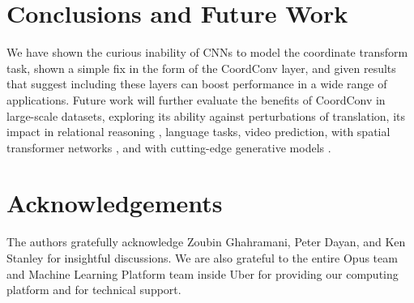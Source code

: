 \documentclass{article}
\begin{document}




\vspace*{-.5em}
\section{Conclusions and Future Work}
\vspace*{-.6em}

We have shown the curious inability of CNNs to model the coordinate transform task, shown a simple fix in the form
of the CoordConv layer, and given results that suggest including these layers can boost performance
in a wide range of applications. Future work will further evaluate the benefits of CoordConv in large-scale datasets, 
exploring its ability against perturbations of translation, 
its impact in relational reasoning \cite{sortofclevr}, language tasks, video prediction, with spatial transformer networks \cite{jaderberg:spatial}, and with cutting-edge generative models \cite{gregor-2015-draw:-a-recurrent-neural}. 


\clearpage

\section*{Acknowledgements}
The authors gratefully acknowledge Zoubin Ghahramani, Peter Dayan, and Ken Stanley for insightful discussions. 
We are also grateful to the entire Opus team and Machine Learning Platform team inside Uber for providing our computing platform and for technical support.




















\clearpage

\renewcommand{\thesection}{S\arabic{section}}
\renewcommand{\thesubsection}{\thesection.\arabic{subsection}}

\newcommand{\beginsupplementary}{\setcounter{table}{0}
	\renewcommand{\thetable}{S\arabic{table}}\setcounter{figure}{0}
	\renewcommand{\thefigure}{S\arabic{figure}}\setcounter{section}{0}
}
     
\end{document}
